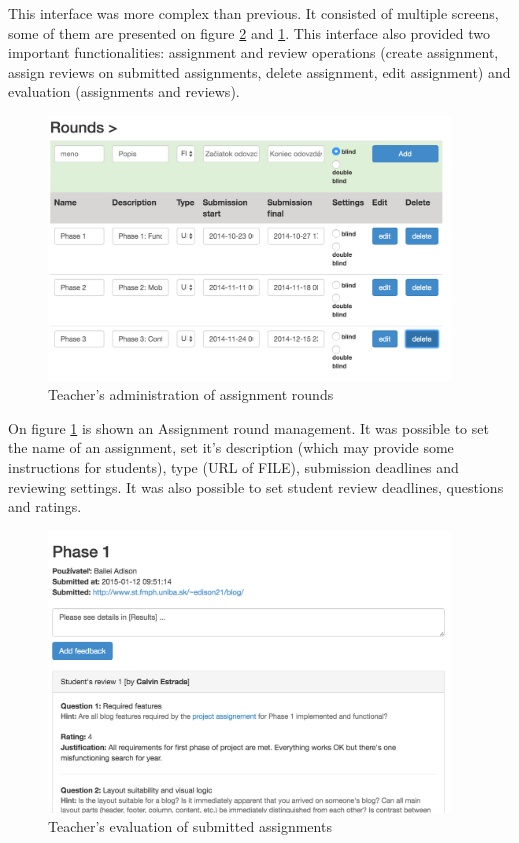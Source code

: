 This interface was more complex than previous. It consisted of multiple screens, some of them are presented on figure \ref{teachereval} and \ref{teacherrounds}. This interface also provided two important functionalities: assignment and review operations (create assignment, assign reviews on submitted assignments, delete assignment, edit assignment) and evaluation (assignments and reviews).



\begin{figure}[h]
    \centering
    \includegraphics[width=0.95\textwidth]{images/teacherrounds.png}
    \caption{Teacher's administration of assignment rounds}
    \label{teacherrounds}
\end{figure}


On figure \ref{teacherrounds} is shown an Assignment round management. It was possible to set the name of an assignment, set it's description (which may provide some instructions for students), type (URL of FILE), submission deadlines and reviewing settings. It was also possible to set student review deadlines, questions and ratings.

\begin{figure}[h]
    \centering
    \includegraphics[width=0.95\textwidth]{images/teachereval.png}
    \caption{Teacher's evaluation of submitted assignments}
    \label{teachereval}
\end{figure}



